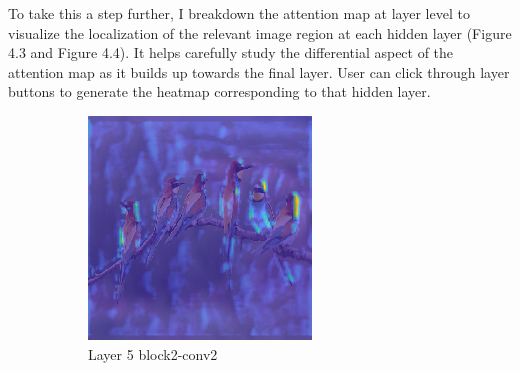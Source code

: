 To take this a step further, I breakdown the attention map at layer level to visualize the localization of the relevant image region at each hidden layer (Figure 4.3 and Figure 4.4). It helps carefully study the differential aspect of the attention map as it builds up towards the final layer. User can click through layer buttons to generate the heatmap corresponding to that hidden layer.

\begin{figure}
     \centering
     \caption{Layer-wise Relevance Heatmap}
     \vspace{1em}
     \begin{subfigure}[b]{0.30\textwidth}
         \centering
         \includegraphics[width=\textwidth]{images/hm-layer-5.png}
         \caption{Layer 5 block2-conv2}
         \label{fig:layer-5}
     \end{subfigure}
     \hspace{1em}%
     \begin{subfigure}[b]{0.30\textwidth}
         \centering

\end{subfigure}
\end{figure}
